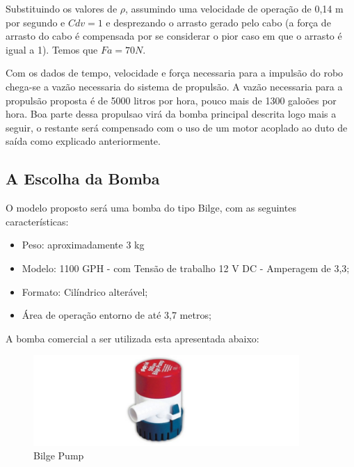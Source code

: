 Substituindo os valores de $\rho$, assumindo uma velocidade de operação de 0,14 m por segundo e $Cdv = 1$ e desprezando o arrasto gerado pelo cabo (a força de arrasto do cabo é compensada por se considerar o pior caso em que o arrasto é igual a 1). Temos que $Fa = 70N$.

Com os dados de tempo, velocidade e força necessaria para a impulsão do robo chega-se a vazão necessaria do sistema de propulsão. A vazão necessaria para a propulsão proposta é de 5000 litros por hora, pouco mais de 1300 galoões por hora. Boa parte dessa propulsao virá da bomba principal descrita logo mais a seguir, o restante será compensado com o uso de um motor acoplado ao duto de saída como explicado anteriormente.

\subsection{A Escolha da Bomba}
O modelo proposto será uma bomba do tipo \textsf{Bilge}, com as seguintes características:
\begin{itemize}
\item Peso: aproximadamente 3 kg
\item Modelo: 1100 GPH - com Tensão de trabalho 12 V DC - Amperagem de 3,3;
\item Formato: Cilíndrico alterável;
\item Área de operação entorno de até 3,7 metros;
\end{itemize}

A bomba comercial a ser utilizada esta apresentada abaixo:
\par
\begin{figure}[h]
  \centering
  \includegraphics[width=0.9\textwidth]{figures/waterbomb.png}
  \caption{Bilge Pump \cite{westmarine2016}}
  \label{fig:waterbomb}
\end{figure}
\FloatBarrier
\par
